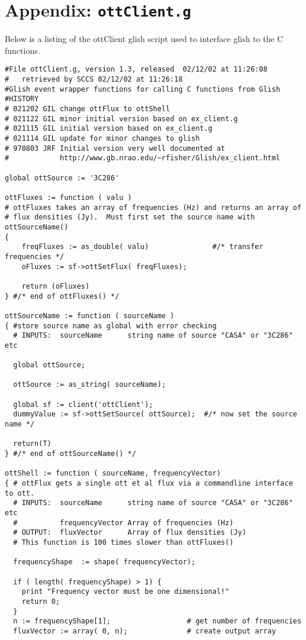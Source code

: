 \section{Appendix: {\tt ottClient.g}}
Below is a listing of the ottClient glish script used to
interface glish to the C functions.
\begin{verbatim}
#File ottClient.g, version 1.3, released  02/12/02 at 11:26:08 
#   retrieved by SCCS 02/12/02 at 11:26:18     
#Glish event wrapper functions for calling C functions from Glish
#HISTORY
# 021202 GIL change ottFlux to ottShell
# 021122 GIL minor initial version based on ex_client.g
# 021115 GIL initial version based on ex_client.g
# 021114 GIL update for minor changes to glish
# 970803 JRF Initial version very well documented at 
#            http://www.gb.nrao.edu/~rfisher/Glish/ex_client.html

global ottSource := '3C286'

ottFluxes := function ( valu )
# ottFluxes takes an array of frequencies (Hz) and returns an array of
# flux densities (Jy).  Must first set the source name with ottSourceName()
{   
    freqFluxes := as_double( valu)               #/* transfer frequencies */
    oFluxes := sf->ottSetFlux( freqFluxes);

    return (oFluxes)
} #/* end of ottFluxes() */

ottSourceName := function ( sourceName )
{ #store source name as global with error checking 
  # INPUTS:  sourceName      string name of source "CASA" or "3C286" etc

  global ottSource;

  ottSource := as_string( sourceName);

  global sf := client('ottClient');
  dummyValue := sf->ottSetSource( ottSource);  #/* now set the source name */

  return(T)
} #/* end of ottSourceName() */

ottShell := function ( sourceName, frequencyVector) 
{ # ottFlux gets a single ott et al flux via a commandline interface to ott.
  # INPUTS:  sourceName      string name of source "CASA" or "3C286" etc
  #          frequencyVector Array of frequencies (Hz)
  # OUTPUT:  fluxVector      Array of flux densities (Jy)
  # This function is 100 times slower than ottFluxes()
 
  frequencyShape  := shape( frequencyVector);  

  if ( length( frequencyShape) > 1) {
    print "Frequency vector must be one dimensional!"
    return 0;
  }
  n := frequencyShape[1];                  # get number of frequencies
  fluxVector := array( 0, n);              # create output array


\end{verbatim}
